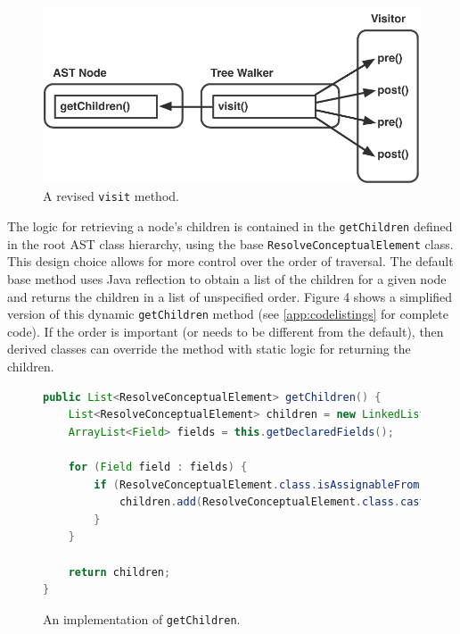 \documentclass[times]{speauth}
\begin{document}
\begin{figure}[!htb]
\centering
\includegraphics[scale=.60]{figures/prepostprepost.pdf}
\caption{A revised \texttt{visit} method.}
\end{figure}

The logic for retrieving a node's children is contained in the \texttt{getChildren} defined in the root AST class hierarchy, using the base \texttt{ResolveConceptualElement} class. This design choice allows for more control over the order of traversal. The default base method uses Java reflection to obtain a list of the children for a given node and returns the children in a list of unspecified order. Figure 4 shows a simplified version of this dynamic \texttt{getChildren} method (see \ref{app:codelistings} for complete code). If the order is important (or needs to be different from the default), then derived classes can override the method with static logic for returning the children.

\begin{figure}[!htb]
\centering
\begin{minipage}{.80\textwidth}
\begin{lstlisting}[language=java]
public List<ResolveConceptualElement> getChildren() {
    List<ResolveConceptualElement> children = new LinkedList<>();
    ArrayList<Field> fields = this.getDeclaredFields();
    
    for (Field field : fields) {
        if (ResolveConceptualElement.class.isAssignableFrom(field.getType())) {
            children.add(ResolveConceptualElement.class.cast(field.get(this)));
        }
    }
    
    return children;
}
\end{lstlisting}
\end{minipage}
\caption{An implementation of \texttt{getChildren}.}
\label{fig:getchildren}
\end{figure}
\end{document}
